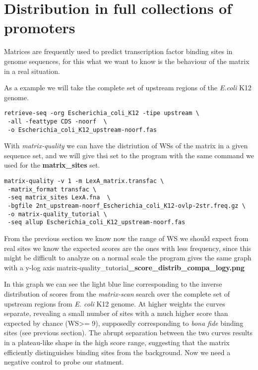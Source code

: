 \section{Distribution in full collections of promoters}

Matrices are frequently used to predict transcription factor binding
sites in genome sequences, for this what we want to know is the
behaviour of the matrix in a real situation.

As a example we will take the complete set of upstream regions of the
\textit{E.coli} K12 genome.

{\color{Blue} \begin{footnotesize}
\begin{verbatim}
retrieve-seq -org Escherichia_coli_K12 -tipe upstream \
 -all -feattype CDS -noorf  \
 -o Escherichia_coli_K12_upstream-noorf.fas
\end{verbatim} 
\end{footnotesize} 
}

With \textit{matrix-quality} we can have the distriution of WSs of the
matrix in a given sequence set, and we will give thsi set to the
program with the same command we used for the \textbf{matrix\_sites}
set.

{\color{Blue} 
\begin{footnotesize}
\begin{verbatim}
matrix-quality -v 1 -m LexA_matrix.transfac \
 -matrix_format transfac \
 -seq matrix_sites LexA.fna  \
 -bgfile 2nt_upstream-noorf_Escherichia_coli_K12-ovlp-2str.freq.gz \
 -o matrix-quality_tutorial \
 -seq allup Escherichia_coli_K12_upstream-noorf.fas
\end{verbatim} 
\end{footnotesize} 
}

From the previous section we know now the range of WS we should expect
from real sites we know the expected scores are the ones with less
frequency, since this might be difficult to analyze on a normal scale
the program gives the same graph with a y-log axis
matrix-quality\_tutorial\textbf{\_score\_distrib\_compa\_logy.png}

In this graph we can see the light blue line corresponding to the
inverse distribution of scores from the \textit{matrix-scan} search
over the complete set of upstream regions from \textit{E. coli} K12
genome. At higher weights the curves separate, revealing a small
number of sites with a much higher score than expected by chance (WS>=
9), supposedly corresponding to \textit{bona fide} binding sites (see
previous section). The abrupt separation between the two curves
results in a plateau-like shape in the high score range, suggesting
that the matrix efficiently distinguishes binding sites from the
background. Now we need a negative control to probe our statment.

